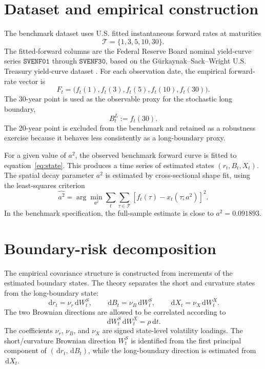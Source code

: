 \documentclass[11pt]{article}
\numberwithin{equation}{section}
\newcommand{\dd}{\,\mathrm{d}}
\begin{document}
\section{Dataset and empirical construction}
The benchmark dataset uses U.S. fitted instantaneous forward rates at maturities
\begin{equation}
 \mathcal{T}=\{1,3,5,10,30\}.
 \label{eq:benchmark-tenors}
\end{equation}
The fitted-forward columns are the Federal Reserve Board nominal yield-curve series $\texttt{SVENF01}$ through $\texttt{SVENF30}$, based on the Gürkaynak--Sack--Wright U.S. Treasury yield-curve dataset \citep{GurkaynakSackWright2007,FederalReserveYieldCurve}. For each observation date, the empirical forward-rate vector is
\begin{equation}
 F_t=\big(f_t(1),f_t(3),f_t(5),f_t(10),f_t(30)\big).
 \label{eq:empirical-vector}
\end{equation}
The 30-year point is used as the observable proxy for the stochastic long boundary,
\begin{equation}
 B_t^L := f_t(30).
 \label{eq:long-boundary-proxy}
\end{equation}
The 20-year point is excluded from the benchmark and retained as a robustness exercise because it behaves less consistently as a long-boundary proxy.

For a given value of $a^2$, the observed benchmark forward curve is fitted to equation~\eqref{eq:state}. This produces a time series of estimated states $(r_t,B_t,X_t)$. The spatial decay parameter $a^2$ is estimated by cross-sectional shape fit, using the least-squares criterion
\begin{equation}
 \widehat{a^2}=\arg\min_{a^2}\sum_t\sum_{\tau\in\mathcal{T}}\left[f_t(\tau)-x_t(\tau;a^2)\right]^2.
 \label{eq:a2-objective}
\end{equation}
In the benchmark specification, the full-sample estimate is close to $a^2=0.091893$.

\section{Boundary-risk decomposition}
The empirical covariance structure is constructed from increments of the estimated boundary states. The theory separates the short and curvature states from the long-boundary state:
\begin{equation}
 \dd r_t=\nu_r\dd W_t^S,\qquad \dd B_t=\nu_B\dd W_t^S,\qquad \dd X_t=\nu_X\dd W_t^X.
 \label{eq:risk-states}
\end{equation}
The two Brownian directions are allowed to be correlated according to
\begin{equation}
 \dd W_t^S\dd W_t^X=\rho\dd t.
 \label{eq:brownian-correlation}
\end{equation}
The coefficients $\nu_r$, $\nu_B$, and $\nu_X$ are signed state-level volatility loadings. The short/curvature Brownian direction $W_t^S$ is identified from the first principal component of $(\dd r_t,\dd B_t)$, while the long-boundary direction is estimated from $\dd X_t$.
\end{document}
